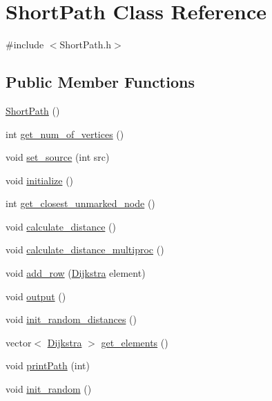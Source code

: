 \hypertarget{class_short_path}{\section{Short\-Path Class Reference}
\label{class_short_path}
}


{\ttfamily \#include $<$Short\-Path.\-h$>$}

\subsection*{Public Member Functions}
\begin{DoxyCompactItemize}
\item 
\hyperlink{class_short_path_aa1f54b3eb632252e0e4f34fed4110d54}{Short\-Path} ()
\item 
int \hyperlink{class_short_path_a04ad21508536061dc0f83aafa2fe25f3}{get\-\_\-num\-\_\-of\-\_\-vertices} ()
\item 
void \hyperlink{class_short_path_a76568de48f805ee8fdd8dac0f07b2188}{set\-\_\-source} (int src)
\item 
void \hyperlink{class_short_path_a113f044a61c1eacafb73df55e12f3803}{initialize} ()
\item 
int \hyperlink{class_short_path_ae218a65d8dd2620afc8c088679c5ab98}{get\-\_\-closest\-\_\-unmarked\-\_\-node} ()
\item 
void \hyperlink{class_short_path_af4ddb3c9a160c273bdc99b3fb43fd58d}{calculate\-\_\-distance} ()
\item 
void \hyperlink{class_short_path_a74f3fa59ffd3e061ef75a7962fbe3cfa}{calculate\-\_\-distance\-\_\-multiproc} ()
\item 
void \hyperlink{class_short_path_af65d23be9601ccf34becf9922c88c263}{add\-\_\-row} (\hyperlink{class_dijkstra}{Dijkstra} element)
\item 
void \hyperlink{class_short_path_aa4ede1b3713f60bef1f23193510199df}{output} ()
\item 
void \hyperlink{class_short_path_a24387db998bac1e88493dc4cf838a68b}{init\-\_\-random\-\_\-distances} ()
\item 
vector$<$ \hyperlink{class_dijkstra}{Dijkstra} $>$ \hyperlink{class_short_path_abf528c510136ea8014abfdd993949a02}{get\-\_\-elements} ()
\item 
void \hyperlink{class_short_path_a363cac67e1c10f524feab977073c35e9}{print\-Path} (int)
\item 
void \hyperlink{class_short_path_af3c6bd7d7b552ca6fa60b89a49db8566}{init\-\_\-random} ()
\item 

\end{DoxyCompactItemize}
